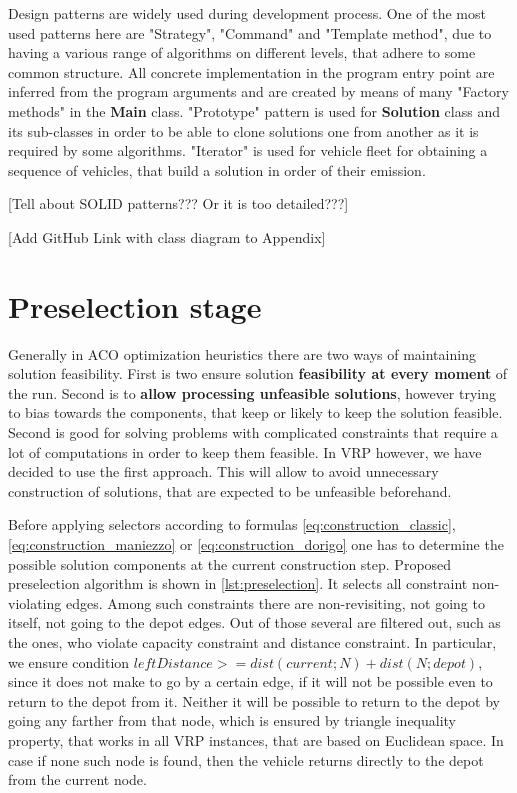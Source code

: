 \documentclass[11pt,a4paper,oneside]{book}
\begin{document}
Design patterns are widely used during development process. One of the most used patterns here are "Strategy", "Command" and "Template method", due to having a various range of algorithms on different levels, that adhere to some common structure. All concrete implementation in the program entry point are inferred from the program arguments and are created by means of many "Factory methods" in the \textbf{Main} class. "Prototype" pattern is used for \textbf{Solution} class and its sub-classes in order to be able to clone solutions one from another as it is required by some algorithms. "Iterator" is used for vehicle fleet for obtaining a sequence of vehicles, that build a solution in order of their emission.


[Tell about SOLID patterns??? Or it is too detailed???]

[Add GitHub Link with class diagram to Appendix]


\section{Preselection stage}

Generally in ACO optimization heuristics there are two ways of maintaining solution feasibility. First is two ensure solution \textbf{feasibility at every moment} of the run. Second is to \textbf{allow processing unfeasible solutions}, however trying to bias towards the components, that keep or likely to keep the solution feasible. Second is good for solving problems with complicated constraints that require a lot of computations in order to keep them feasible. In VRP however, we have decided to use the first approach. This will allow to avoid unnecessary construction of solutions, that are expected to be unfeasible beforehand. \par

Before applying selectors according to formulas \ref{eq:construction_classic}, \ref{eq:construction_maniezzo} or \ref{eq:construction_dorigo} one has to determine the possible solution components at the current construction step. Proposed preselection algorithm is shown in \ref{lst:preselection}. It selects all constraint non-violating edges. Among such constraints there are non-revisiting, not going to itself, not going to the depot edges. Out of those several are filtered out, such as the ones, who violate capacity constraint and distance constraint. In particular, we ensure condition $leftDistance >= dist(current;N) + dist(N;depot)$, since it does not make to go by a certain edge, if it will not be possible even to return to the depot from it. Neither it will be possible to return to the depot by going any farther from that node, which is ensured by triangle inequality property, that works in all VRP instances, that are based on Euclidean space. In case if none such node is found, then the vehicle returns directly to the depot from the current node.
\end{document}
